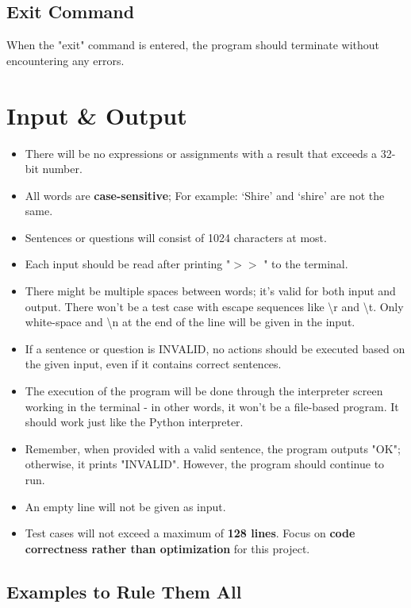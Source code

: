 \documentclass[12pt]{article}
\begin{document}
\begin{itemize}
\end{itemize}

\subsection{Exit Command}

When the "exit" command is entered, the program should terminate without encountering any errors.

\section{Input \& Output}
\begin{itemize}
\item There will be no expressions or assignments with a result that exceeds a 32-bit number. 
\item All words are \textbf{case-sensitive}; For example: `Shire' and `shire' are not the same.
\item Sentences or questions will consist of 1024 characters at most.
\item Each input should be read after printing "$>>$ " to the terminal.
\item There might be multiple spaces between words; it's valid for both input and output. There won't be a test case with escape sequences like \textbackslash{r} and \textbackslash{t}. Only white-space and \textbackslash{n} at the end of the line will be given in the input.
\item If a sentence or question is INVALID, no actions should be executed based on the given input, even if it contains correct sentences.
\item The execution of the program will be done through the interpreter screen working in the terminal - in other words, it won't be a file-based program. It should work just like the Python interpreter. 
\item Remember, when provided with a valid sentence, the program outputs "OK"; otherwise, it prints "INVALID". However, the program should continue to run.
\item An empty line will not be given as input.
\item Test cases will not exceed a maximum of \textbf{128 lines}. Focus on \textbf{code correctness rather than optimization} for this project.

\end{itemize}
\subsection{Examples to Rule Them All}
\end{document}
